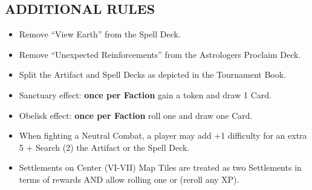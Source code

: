 \begin{multicols*}{2}
\subsection*{\MakeUppercase{Additional Rules}}
\begin{itemize}
  \item Remove ``View Earth'' from the Spell Deck.
  \item Remove ``Unexpected Reinforcements'' from the Astrologers Proclaim Deck.
  \item Split the Artifact and Spell Decks as depicted in the Tournament Book. %
  \item Sanctuary effect: \textbf{once per Faction} gain a  token and draw 1 Card.
  \item Obelisk effect: \textbf{once per Faction} roll one  and draw one Card.
  \item When fighting a Neutral Combat, a player may add +1 difficulty for an extra 5  + Search (2) the Artifact or the Spell Deck.
  \item Settlements on Center (VI-VII) Map Tiles are treated as two Settlements in terms of rewards AND allow rolling one  or  (reroll any XP).
  

\end{itemize}
\end{multicols*}
